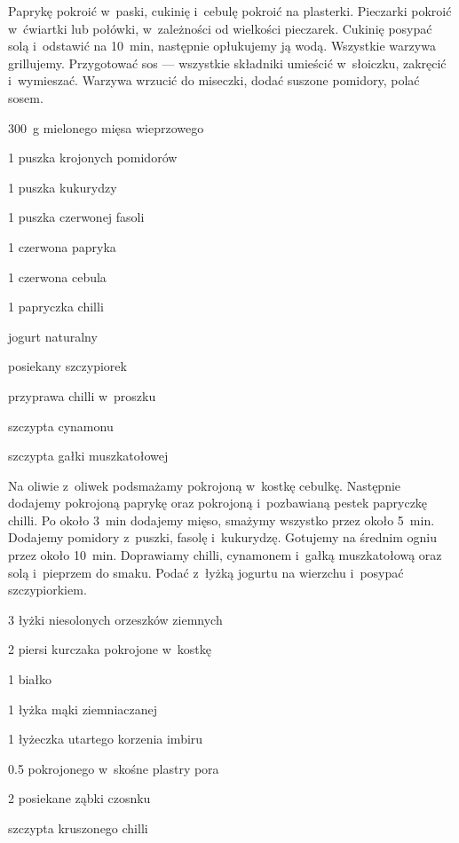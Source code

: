 \documentclass[../kucharek.tex]{subfiles}
\begin{document}
Paprykę pokroić w~paski, cukinię i~cebulę pokroić na plasterki. Pieczarki
pokroić w~ćwiartki lub połówki, w~zależności od wielkości pieczarek. Cukinię
posypać solą i~odstawić na \qty{10}{\minute}, następnie opłukujemy ją wodą.
Wszystkie warzywa grillujemy. Przygotować sos — wszystkie składniki umieścić
w~słoiczku, zakręcić i~wymieszać. Warzywa wrzucić do miseczki, dodać suszone
pomidory, polać sosem.


\begin{Ingred}
    \item \qty{300}{\gram} mielonego mięsa wieprzowego
    \item \num{1} puszka krojonych pomidorów
    \item \num{1} puszka kukurydzy
    \item \num{1} puszka czerwonej fasoli
    \item \num{1} czerwona papryka
    \item \num{1} czerwona cebula
    \item \num{1} papryczka chilli
    \item jogurt naturalny
    \item posiekany szczypiorek
    \item przyprawa chilli w~proszku
    \item szczypta cynamonu
    \item szczypta gałki muszkatołowej
\end{Ingred}

Na oliwie z~oliwek podsmażamy pokrojoną w~kostkę cebulkę. Następnie dodajemy
pokrojoną paprykę oraz pokrojoną i~pozbawianą pestek papryczkę chilli. Po około
\qty{3}{\minute} dodajemy mięso, smażymy wszystko przez około \qty{5}{\minute}.
Dodajemy pomidory z~puszki, fasolę i~kukurydzę. Gotujemy na średnim ogniu przez
około \qty{10}{\minute}. Doprawiamy chilli, cynamonem i~gałką muszkatołową oraz
solą i~pieprzem do smaku. Podać z~łyżką jogurtu na wierzchu i~posypać
szczypiorkiem.


\begin{Ingred}
    \item \num{3} łyżki niesolonych orzeszków ziemnych
    \item \num{2} piersi kurczaka pokrojone w~kostkę
\end{Ingred}

\begin{Ingred}[marynata]
    \item \num{1} białko
    \item \num{1} łyżka mąki ziemniaczanej
    \item \num{1} łyżeczka utartego korzenia imbiru
    \item \num{0.5} pokrojonego w~skośne plastry pora
    \item \num{2} posiekane ząbki czosnku
    \item szczypta kruszonego chilli
\end{Ingred}
\end{document}

